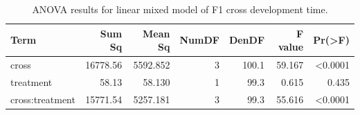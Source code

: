 \begin{table}[!h]
\centering
\caption{\label{tab:anova_f1cross}ANOVA results for linear mixed model of F1 cross development time.}
\centering
\begin{tabular}[t]{lrrrrrr}
\toprule
Term & Sum Sq & Mean Sq & NumDF & DenDF & F value & Pr(>F)\\
\midrule
cross & 16778.56 & 5592.852 & 3 & 100.1 & 59.167 & <0.0001\\
treatment & 58.13 & 58.130 & 1 & 99.3 & 0.615 & 0.435\\
cross:treatment & 15771.54 & 5257.181 & 3 & 99.3 & 55.616 & <0.0001\\
\bottomrule
\end{tabular}
\end{table}
